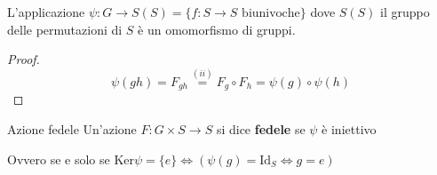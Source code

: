 \begin{proposition}

L'applicazione \(\psi : G \to S(S) = \{f : S\to S \text{ biunivoche}\}\) dove
\(S{(S)}\) il gruppo delle permutazioni di \(S\) è un omomorfismo di gruppi.
\end{proposition}
\begin{proof}
\[
    \psi{(gh)}= F_{gh} \overset{(ii)}{=} F_g \circ F_h = \psi{(g)} \circ
    \psi{(h)}
\]
\end{proof}
\begin{definition}{Azione fedele}
    Un'azione \(F : G \times S \to S\) si dice \textbf{fedele} se \(\psi\) è
    iniettivo
\end{definition}
\begin{remark}
    Ovvero se e solo se \(\text{Ker}\psi = \{e\} \iff (\psi{(g)} = \text{Id}_S
    \iff g = e)\) 
\end{remark}

